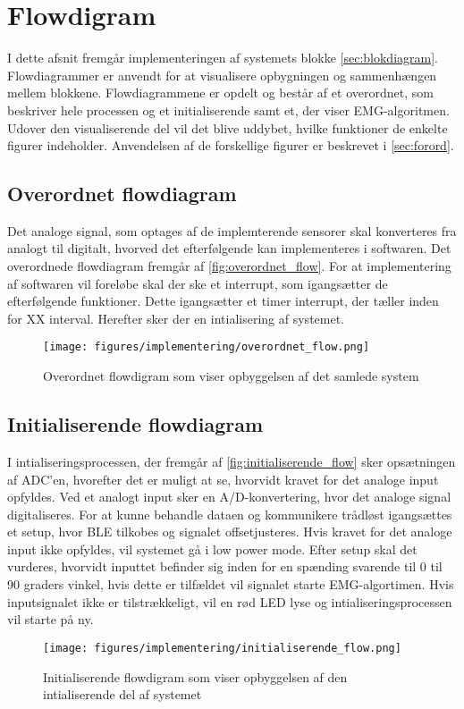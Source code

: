 \section{Flowdigram}
I dette afsnit fremgår implementeringen af systemets blokke \autoref{sec:blokdiagram}. Flowdiagrammer er anvendt for at visualisere opbygningen og sammenhængen mellem blokkene. Flowdiagrammene er opdelt og består af et overordnet, som beskriver hele processen og et initialiserende samt et, der viser EMG-algoritmen. Udover den visualiserende del vil det blive uddybet, hvilke funktioner de enkelte figurer indeholder. Anvendelsen af de forskellige figurer er beskrevet i \autoref{sec:forord}. 

\subsection{Overordnet flowdiagram}	
Det analoge signal, som optages af de implemterende sensorer skal konverteres fra analogt til digitalt, hvorved det efterfølgende kan implementeres i softwaren. Det overordnede flowdiagram fremgår af \autoref{fig:overordnet_flow}. For at implementering af softwaren vil foreløbe skal der ske et interrupt, som igangsætter de efterfølgende funktioner. Dette igangsætter et timer interrupt, der tæller inden for XX interval. Herefter sker der en intialisering af systemet.

\begin{figure}[H]
\centering
\texttt{[image: figures/implementering/overordnet\_flow.png]}
\caption{Overordnet flowdigram som viser opbyggelsen af det samlede system}
\label{fig:overordnet_flow}
\end{figure}


\subsection{Initialiserende flowdiagram}
I intialiseringsprocessen, der fremgår af \autoref{fig:initialiserende_flow} sker opsætningen af ADC'en, hvorefter det er muligt at se, hvorvidt kravet for det analoge input opfyldes. Ved et analogt input sker en A/D-konvertering, hvor det analoge signal digitaliseres. For at kunne behandle dataen og kommunikere trådløst igangsættes et setup, hvor BLE tilkobes og signalet offsetjusteres. Hvis kravet for det analoge input ikke opfyldes, vil systemet gå i low power mode. Efter setup skal det vurderes, hvorvidt inputtet befinder sig inden for en spænding svarende til 0 til 90 graders vinkel, hvis dette er tilfældet vil signalet starte EMG-algortimen. Hvis inputsignalet ikke er tilstrækkeligt, vil en rød LED lyse og intialiseringsprocessen vil starte på ny. 
\begin{figure}[H]
\centering
\texttt{[image: figures/implementering/initialiserende\_flow.png]}
\caption{Initialiserende flowdigram som viser opbyggelsen af den intialiserende del af systemet}
\label{fig:initialiserende_flow}
\end{figure}

